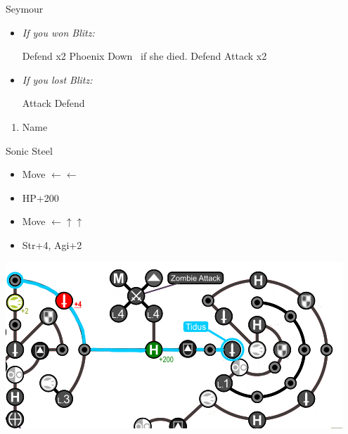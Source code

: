 \begin{battle}[6000]{Seymour}
  \begin{itemize}
  \item \textit{If you won Blitz:}
  \begin{itemize}
    \tidusf Defend x2 Phoenix Down \rikku\ if she died.
    \rikkuf Defend
    \tidusf Attack x2
    \end{itemize}
    \item \textit{If you lost Blitz:}
    \begin{itemize}
    \tidusf Attack
    \rikkuf Defend
    \end{itemize}
  \end{itemize}
\end{battle}
\begin{enumerate}[resume]
  \item Name \shiva
\end{enumerate}
\begin{equip}
\begin{itemize}
\tidusf Sonic Steel
\end{itemize}
\end{equip}
\begin{spheregrid}
  \begin{itemize}
    \tidusf
    \begin{itemize}
      \item Move $\leftarrow\leftarrow$
      \item HP+200
      \item Move $\leftarrow\uparrow\uparrow$
      \item Str+4, Agi+2
    \end{itemize}
    \includegraphics[width=.8\columnwidth]{graphics/Tidus_Post_Seymour}
  \end{itemize}
\end{spheregrid}
